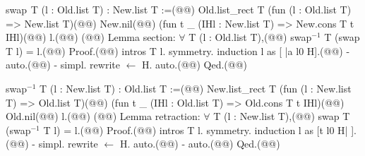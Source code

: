 swap$\phantom{^{2}}$T (l : Old.list T) : New.list T :=(@\vspace{-0.04cm}@)
  Old.list_rect T (fun (l : Old.list T) => New.list T)(@\vspace{-0.04cm}@)
    New.nil(@\vspace{-0.04cm}@)
    (fun t _ (IHl : New.list T) => New.cons T t IHl)(@\vspace{-0.04cm}@)
    l.(@\vspace{-0.04cm}@)
(@\vspace{-0.14cm}@)
Lemma section: $\forall$ T (l : Old.list T),(@\vspace{-0.04cm}@)
  swap$^{-1}$ T (swap T l) = l.(@\vspace{-0.04cm}@)
Proof.(@\vspace{-0.04cm}@)
  intros T l. symmetry. induction l as [ |a l0 H].(@\vspace{-0.04cm}@)
  - auto.(@\vspace{-0.04cm}@)
  - simpl. rewrite $\leftarrow$ H. auto.(@\vspace{-0.04cm}@)
Qed.(@\vspace{-0.04cm}@)

swap$^{-1}$ T (l : New.list T) : Old.list T :=(@\vspace{-0.04cm}@)
  New.list_rect T (fun (l : New.list T) => Old.list T)(@\vspace{-0.04cm}@)
    (fun t _ (IHl : Old.list T) => Old.cons T t IHl)(@\vspace{-0.04cm}@)
    Old.nil(@\vspace{-0.04cm}@)
    l.(@\vspace{-0.04cm}@)
(@\vspace{-0.14cm}@)
Lemma retraction: $\forall$ T (l : New.list T),(@\vspace{-0.04cm}@)
  swap T (swap$^{-1}$ T l) = l.(@\vspace{-0.04cm}@)
Proof.(@\vspace{-0.04cm}@)
  intros T l. symmetry. induction l as [t l0 H| ].(@\vspace{-0.04cm}@)
  - simpl. rewrite $\leftarrow$ H. auto.(@\vspace{-0.04cm}@)
  - auto.(@\vspace{-0.04cm}@)
Qed.(@\vspace{-0.04cm}@)
